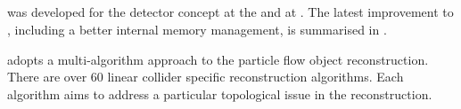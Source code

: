 \subsection{\pandora}
\label{sec:pandoraPandoraPFA}



\pandora was developed for the \ILD detector concept \cite{Thomson:2009rp} at the \ILC and at \CLIC  \cite{Linssen:2012hp,Marshall:2012ry}. The latest improvement to \pandora, including a better internal memory management, is summarised in  \cite{Marshall:2015rfa}.

\pandora adopts a multi-algorithm approach to the particle flow object reconstruction. There are over 60 \ee linear collider specific reconstruction algorithms. Each algorithm aims to address a particular topological issue in the reconstruction.


